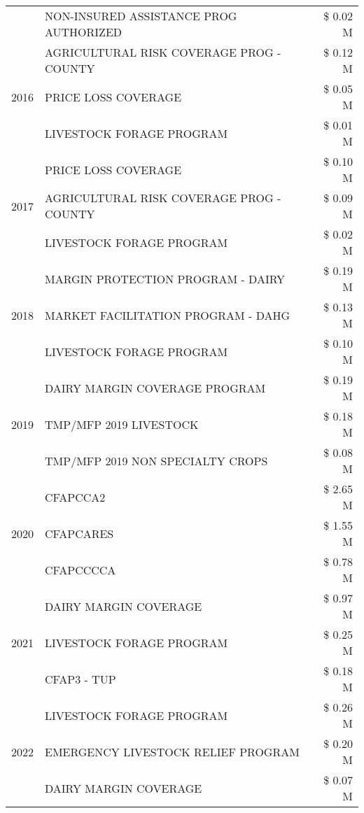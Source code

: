 \begin{tabular}{llr}
 & NON-INSURED ASSISTANCE PROG AUTHORIZED & \$ 0.02 M \\
\cline{1-3}
\multirow[t]{3}{*}{2016} & AGRICULTURAL RISK COVERAGE PROG - COUNTY & \$ 0.12 M \\
 & PRICE LOSS COVERAGE & \$ 0.05 M \\
 & LIVESTOCK FORAGE PROGRAM & \$ 0.01 M \\
\cline{1-3}
\multirow[t]{3}{*}{2017} & PRICE LOSS COVERAGE & \$ 0.10 M \\
 & AGRICULTURAL RISK COVERAGE PROG - COUNTY & \$ 0.09 M \\
 & LIVESTOCK FORAGE PROGRAM & \$ 0.02 M \\
\cline{1-3}
\multirow[t]{3}{*}{2018} & MARGIN PROTECTION PROGRAM - DAIRY & \$ 0.19 M \\
 & MARKET FACILITATION PROGRAM - DAHG & \$ 0.13 M \\
 & LIVESTOCK FORAGE PROGRAM & \$ 0.10 M \\
\cline{1-3}
\multirow[t]{3}{*}{2019} & DAIRY MARGIN COVERAGE PROGRAM & \$ 0.19 M \\
 & TMP/MFP 2019 LIVESTOCK & \$ 0.18 M \\
 & TMP/MFP 2019 NON SPECIALTY CROPS & \$ 0.08 M \\
\cline{1-3}
\multirow[t]{3}{*}{2020} & CFAPCCA2 & \$ 2.65 M \\
 & CFAPCARES & \$ 1.55 M \\
 & CFAPCCCCA & \$ 0.78 M \\
\cline{1-3}
\multirow[t]{3}{*}{2021} & DAIRY MARGIN COVERAGE & \$ 0.97 M \\
 & LIVESTOCK FORAGE PROGRAM & \$ 0.25 M \\
 & CFAP3 - TUP & \$ 0.18 M \\
\cline{1-3}
\multirow[t]{3}{*}{2022} & LIVESTOCK FORAGE PROGRAM & \$ 0.26 M \\
 & EMERGENCY LIVESTOCK RELIEF PROGRAM & \$ 0.20 M \\
 & DAIRY MARGIN COVERAGE & \$ 0.07 M \\
\cline{1-3}
\bottomrule
\end{tabular}
